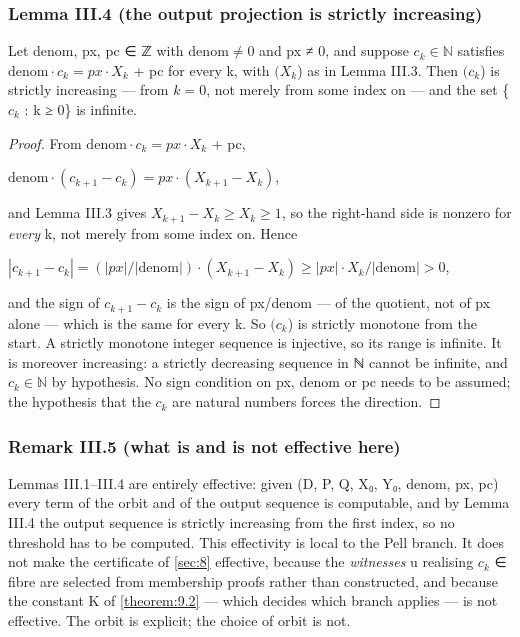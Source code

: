 \subsubsection*{Lemma III.4 (the output projection is strictly increasing)}
Let denom, px, pc ∈ ℤ with $\mathrm{denom} ≠ 0$ and px ≠ 0, and suppose $c_{k} ∈ ℕ$ satisfies $\mathrm{denom}·c_{k} = px·X_{k}$ + pc for every k, with $(X_{k}$) as in Lemma III.3. Then $(c_{k}$) is strictly increasing — from $k = 0$, not merely from some index on — and the set \{$c_{k}$ : k ≥ 0\} is infinite.

\begin{proof}
From $\mathrm{denom}·c_{k} = px·X_{k}$ + pc,

$\mathrm{denom}·(c_{k+1} − c_{k}) = px·(X_{k+1} − X_{k})$,

and Lemma III.3 gives $X_{k+1} − X_{k} ≥ X_{k} ≥ 1$, so the right-hand side is nonzero for \emph{every} k, not merely from some index on. Hence

$|c_{k+1} − c_{k}| = (|px|/|\mathrm{denom}|)·(X_{k+1} − X_{k}) ≥ |px|·X_{k}/|\mathrm{denom}| > 0$,

and the sign of $c_{k+1} − c_{k}$ is the sign of px/denom — of the quotient, not of px alone — which is the same for every k. So $(c_{k}$) is strictly monotone from the start. A strictly monotone integer sequence is injective, so its range is infinite. It is moreover increasing: a strictly decreasing sequence in ℕ cannot be infinite, and $c_{k} ∈ ℕ$ by hypothesis. No sign condition on px, denom or pc needs to be assumed; the hypothesis that the $c_{k}$ are natural numbers forces the direction.

\end{proof}
\subsubsection*{Remark III.5 (what is and is not effective here)}
Lemmas III.1–III.4 are entirely effective: given (D, P, Q, X₀, Y₀, denom, px, pc) every term of the orbit and of the output sequence is computable, and by Lemma III.4 the output sequence is strictly increasing from the first index, so no threshold has to be computed. This effectivity is local to the Pell branch. It does not make the certificate of \cref{sec:8} effective, because the \emph{witnesses} u realising $c_{k}$ ∈ fibre are selected from membership proofs rather than constructed, and because the constant K of \cref{theorem:9.2} — which decides which branch applies — is not effective. The orbit is explicit; the choice of orbit is not.

